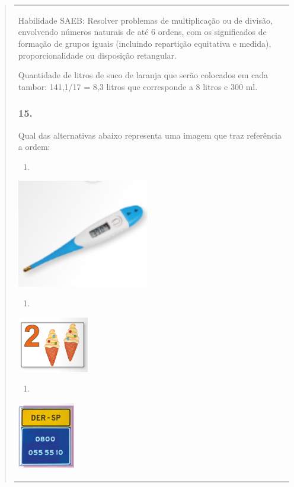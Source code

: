 \begin{enumerate}
\begin{escolha}
\begin{enumerate}
\begin{itemize}
\begin{itemize}
\begin{escolha}
\begin{quote}
\begin{escolha}
{\begin{longtable}[]{@{}l@{}}
\begin{itemize}
Habilidade SAEB: Resolver problemas de multiplicação ou de divisão,
envolvendo números naturais de até 6 ordens, com os significados de
formação de grupos iguais (incluindo repartição equitativa e medida),
proporcionalidade ou disposição retangular.

Quantidade de litros de suco de laranja que serão colocados em cada
tambor: 141,1/17 = 8,3 litros que corresponde a 8 litros e 300 ml.

\subsubsection{15.}\label{section-156}

Qual das alternativas abaixo representa uma imagem que traz referência a
ordem:

\begin{enumerate}
\def\labelenumi{\alph{enumi})}
\item
\end{enumerate}

\includegraphics[width=2.27516in,height=1.85833in]{media/image148.png}

\begin{enumerate}
\def\labelenumi{\alph{enumi})}
\item
\end{enumerate}

\includegraphics[width=1.21677in,height=0.95842in]{media/image149.png}

\begin{enumerate}
\def\labelenumi{\alph{enumi})}
\item
\end{enumerate}

\includegraphics[width=0.98342in,height=1.15010in]{media/image150.png}


\end{itemize}
\end{longtable}}
\end{escolha}
\end{quote}
\end{escolha}
\end{itemize}
\end{itemize}
\end{enumerate}
\end{escolha}
\end{enumerate}
